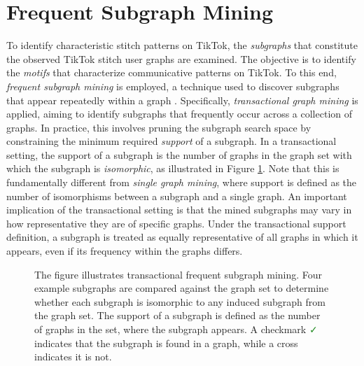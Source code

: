 


\section{Frequent Subgraph Mining}
To identify characteristic stitch patterns on TikTok, the \textit{subgraphs} that constitute the observed TikTok stitch user graphs are examined. The objective is to identify the \textit{motifs} that characterize communicative patterns on TikTok. To this end, \textit{frequent subgraph mining} is employed, a technique used to discover subgraphs that appear repeatedly within a graph \citep{coscia2021atlasaspiringnetworkscientist}. Specifically, \textit{transactional graph mining} is applied, aiming to identify subgraphs that frequently occur across a collection of graphs. In practice, this involves pruning the subgraph search space by constraining the minimum required \textit{support} of a subgraph. In a transactional setting, the support of a subgraph is the number of graphs in the graph set with which the subgraph is \textit{isomorphic}, as illustrated in Figure \ref{fig:fsm}. Note that this is fundamentally different from \textit{single graph mining}, where support is defined as the number of isomorphisms between a subgraph and a single graph. An important implication of the transactional setting is that the mined subgraphs may vary in how representative they are of specific graphs. Under the transactional support definition, a subgraph is treated as equally representative of all graphs in which it appears, even if its frequency within the graphs differs.

\begin{figure}[h]
    \centering
    
    \caption{The figure illustrates transactional frequent subgraph mining. Four example subgraphs are compared against the graph set to determine whether each subgraph is isomorphic to any induced subgraph from the graph set. The support of a subgraph is defined as the number of graphs in the set, where the subgraph appears. A checkmark \textcolor{ForestGreen}{\faCheck} indicates that the subgraph is found in a graph, while a cross \textcolor{red}{\faTimes} indicates it is not.}
    \label{fig:fsm}
\end{figure}

